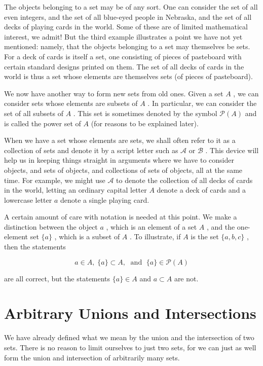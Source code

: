 \documentclass[10pt]{article}
\begin{document}
The objects belonging to a set may be of any sort. One can consider the set of all even integers, and the set of all blue-eyed people in Nebraska, and the set of all decks of playing cards in the world. Some of these are of limited mathematical interest, we admit! But the third example illustrates a point we have not yet mentioned: namely, that the objects belonging to a set may themselves be sets. For a deck of cards is itself a set, one consisting of pieces of pasteboard with certain standard designs printed on them. The set of all decks of cards in the world is thus a set whose elements are themselves sets (of pieces of pasteboard).

We now have another way to form new sets from old ones. Given a set \(A\) , we can consider sets whose elements are subsets of \(A\) . In particular, we can consider the set of all subsets of \(A\) . This set is sometimes denoted by the symbol \(\mathcal{P}\left( A\right)\) and is called the power set of \(A\) (for reasons to be explained later).

When we have a set whose elements are sets, we shall often refer to it as a collection of sets and denote it by a script letter such as \(\mathcal{A}\) or \(\mathcal{B}\) . This device will help us in keeping things straight in arguments where we have to consider objects, and sets of objects, and collections of sets of objects, all at the same time. For example, we might use \(\mathcal{A}\) to denote the collection of all decks of cards in the world, letting an ordinary capital letter \(A\) denote a deck of cards and a lowercase letter \(a\) denote a single playing card.

A certain amount of care with notation is needed at this point. We make a distinction between the object \(a\) , which is an element of a set \(A\) , and the one-element set \(\{ a\}\) , which is a subset of \(A\) . To illustrate, if \(A\) is the set \(\{ a,b,c\}\) , then the statements

\[
a \in  A,\;\{ a\}  \subset  A,\;\text{ and }\;\{ a\}  \in  \mathcal{P}\left( A\right)
\]

are all correct, but the statements \(\{ a\}  \in  A\) and \(a \subset  A\) are not.

\section*{Arbitrary Unions and Intersections}

We have already defined what we mean by the union and the intersection of two sets. There is no reason to limit ourselves to just two sets, for we can just as well form the union and intersection of arbitrarily many sets.
\end{document}

